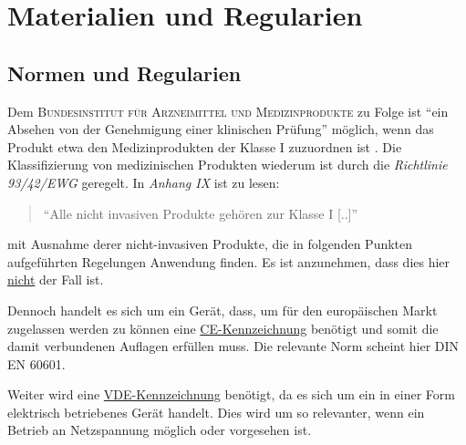 	\section{Materialien und Regularien}
		\subsection{Normen und Regularien}
			Dem \textsc{Bundesinstitut für Arzneimittel und Medizinprodukte} zu Folge ist \enquote{ein Absehen von der Genehmigung einer klinischen Prüfung} \cite{genehmigungspflicht.BfArM}
			möglich, wenn das Produkt etwa den Medizinprodukten der Klasse I zuzuordnen ist \cite{MPG}. Die Klassifizierung von medizinischen
			Produkten wiederum ist durch die \textit{Richtlinie 93/42/EWG} geregelt. In \textit{Anhang IX} ist zu lesen:
			\begin{quote}
				\enquote{Alle nicht invasiven Produkte gehören zur Klasse I [..]} \cite{directive.93-2-EC.medizinprodukte.2007}
			\end{quote}
			mit Ausnahme derer nicht-invasiven Produkte, die in folgenden Punkten aufgeführten Regelungen Anwendung finden.
			Es ist anzunehmen, dass dies hier \underline{nicht} der Fall ist.\par\medskip

			Dennoch handelt es sich um ein Gerät, dass, um für den europäischen Markt zugelassen werden zu können eine \underline{CE-Kennzeichnung}
			benötigt und somit die damit verbundenen Auflagen erfüllen muss. Die relevante Norm scheint hier \textsc{DIN EN 60601}.\par
			Weiter wird eine \underline{VDE-Kennzeichnung} benötigt, da es sich um ein in einer Form elektrisch betriebenes Gerät handelt.
			Dies wird um so relevanter, wenn ein Betrieb an Netzspannung möglich oder vorgesehen ist.

